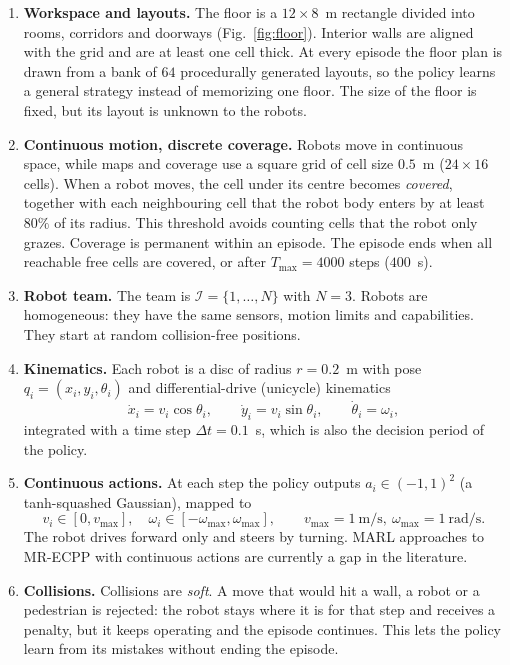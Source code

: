 \documentclass[11pt,a4paper]{article}
\begin{document}
\begin{enumerate}[label=\textbf{\arabic*.}]

\item \textbf{Workspace and layouts.}
The floor is a $12\times 8$~m rectangle divided into rooms, corridors and
doorways (Fig.~\ref{fig:floor}). Interior walls are aligned with the grid and
are at least one cell thick. At every episode the floor plan is drawn from a
bank of $64$ procedurally generated layouts, so the policy learns a general
strategy instead of memorizing one floor. The size of the floor is fixed, but
its layout is unknown to the robots.

\item \textbf{Continuous motion, discrete coverage.}
Robots move in continuous space, while maps and coverage use a square grid
of cell size $0.5$~m ($24\times16$ cells). When a robot moves, the cell under
its centre becomes \emph{covered}, together with each neighbouring cell that
the robot body enters by at least $80\%$ of its radius. This threshold avoids
counting cells that the robot only grazes. Coverage is permanent within an
episode. The episode ends when all reachable free cells are covered, or after
$T_{\max}=4000$ steps ($400$~s).

\item \textbf{Robot team.}
The team is $\mathcal I=\{1,\dots,N\}$ with $N=3$. Robots are homogeneous:
they have the same sensors, motion limits and capabilities. They start at
random collision-free positions.

\item \textbf{Kinematics.}
Each robot is a disc of radius $r=0.2$~m with pose $q_i=(x_i,y_i,\theta_i)$
and differential-drive (unicycle) kinematics
\[
 \dot x_i=v_i\cos\theta_i,\qquad
 \dot y_i=v_i\sin\theta_i,\qquad
 \dot\theta_i=\omega_i,
\]
integrated with a time step $\Delta t=0.1$~s, which is also the decision
period of the policy.

\item \textbf{Continuous actions.}
At each step the policy outputs $a_i\in(-1,1)^2$ (a tanh-squashed Gaussian),
mapped to
\[
 v_i\in[0,v_{\max}],\quad \omega_i\in[-\omega_{\max},\omega_{\max}],
 \qquad v_{\max}=1~\text{m/s},\ \omega_{\max}=1~\text{rad/s}.
\]
The robot drives forward only and steers by turning. MARL approaches to
MR-ECPP with continuous actions are currently a gap in the literature.

\item \textbf{Collisions.}
Collisions are \emph{soft}. A move that would hit a wall, a robot or a
pedestrian is rejected: the robot stays where it is for that step and
receives a penalty, but it keeps operating and the episode continues. This
lets the policy learn from its mistakes without ending the episode.


\end{enumerate}
\end{document}
